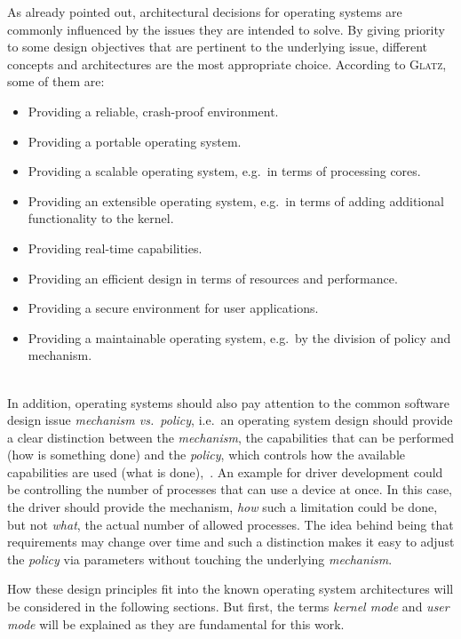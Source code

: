 As already pointed out, architectural decisions for operating systems are commonly influenced by the issues they are intended to solve.
By giving priority to some design objectives that are pertinent to the underlying issue, different concepts and architectures are the most appropriate choice.
According to \textsc{Glatz}\cite{glatz2015betriebssysteme}, some of them are:
\begin{itemize}
    \item Providing a reliable, crash-proof environment.
    \item Providing a portable operating system.
    \item Providing a scalable operating system, e.g.\ in terms of processing cores.
    \item Providing an extensible operating system, e.g.\ in terms of adding additional functionality to the kernel.
    \item Providing real-time capabilities.
    \item Providing an efficient design in terms of resources and performance.
    \item Providing a secure environment for user applications.
    \item Providing a maintainable operating system, e.g.\ by the division of policy and mechanism. 
\end{itemize}\ \\
%
In addition, operating systems should also pay attention to the common software design issue \textit{mechanism vs.\ policy}, i.e.\ an operating system design should provide a clear distinction between the \textit{mechanism}, the capabilities that can be performed (how is something done) and the \textit{policy}, which controls how the available capabilities are used (what is done)\cite{lfd430},~\cite{silberschatz2009operating}.
An example for driver development could be controlling the number of processes that can use a device at once.
In this case, the driver should provide the mechanism, \textit{how} such a limitation could be done, but not \textit{what}, the actual number of allowed processes. 
The idea behind being that requirements may change over time and such a distinction makes it easy to adjust the \textit{policy} via parameters without touching the underlying \textit{mechanism}\cite{silberschatz2009operating}.

How these design principles fit into the known operating system architectures will be considered in the following sections.
But first, the terms \textit{kernel mode} and \textit{user mode} will be explained as they are fundamental for this work.

